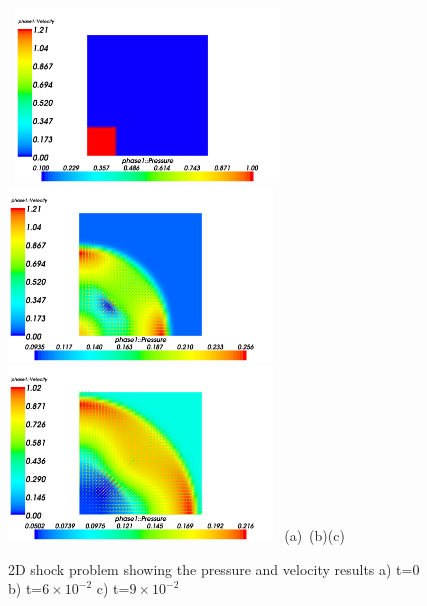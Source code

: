 \begin{figure}[H]
\vbox{
\hbox{
\hspace{-1.cm}
\includegraphics[width=7.0cm]{./doc_figures/shock/2d-shock-pv0}
\hspace{-1.cm}
\includegraphics[width=7.0cm]{./doc_figures/shock/2d-shock-pv60}
\hspace{-1.cm}
\includegraphics[width=7.0cm]{./doc_figures/shock/2d-shock-pv90}
}
\vspace{-0.cm}
\hbox{\hspace{4.cm}(a) \hspace{4.5cm}(b)\hspace{4.5cm}(c)}
\vspace{-0.cm}}
\label{2d-pressure-vel}
\caption{ 2D shock problem showing the pressure and velocity results a) 
t=0 b) t=$6\times 10^{-2}$ c) t=$9\times 10^{-2}$ }
\end{figure}


